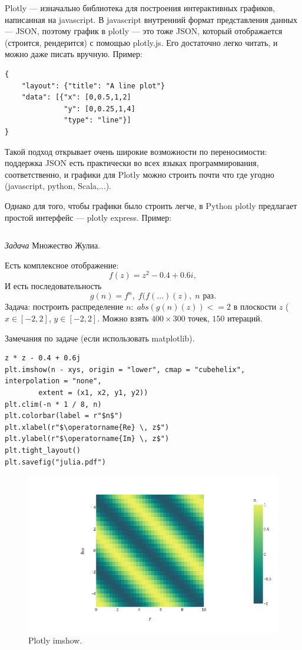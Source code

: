 \documentclass{book}
\begin{document}
Plotly --- изначально библиотека для построения интерактивных графиков, написанная на javascript. В javascript внутренний формат
представления данных --- JSON, поэтому график в plotly --- это тоже JSON, который отображается (строится, рендерится) с помощью plotly.js.
Его достаточно легко читать, и можно даже писать вручную. Пример:
\begin{verbatim}
{
    "layout": {"title": "A line plot"}
    "data": [{"x": [0,0.5,1,2]
              "y": [0,0.25,1,4]
              "type": "line"}]
}
\end{verbatim}
Такой подход открывает очень широкие возможности по переносимости: поддержка JSON есть практически во всех языках программирования,
соответственно, и графики для Plotly можно строить почти что где угодно (javascript, python, Scala,...).

Однако для того, чтобы графики было строить легче, в Python plotly предлагает простой интерфейс --- plotly express. Пример:
\inputminted{python}{simple_plotly_express.py}

\textit{Задача} Множество Жулиа.

Есть комплексное отображение:
\begin{equation}
    f(z) = z^2 - 0.4 + 0.6 i,
\end{equation}
И есть последовательность
\begin{equation}
    g(n) = f^n, \; f(f( ...)(z), \; n \text{ раз}.
\end{equation}
Задача: построить распределение $n: \; abs(g(n)(z)) <= 2$ в плоскости $z$ ($x \in
[-2, 2]$, $y \in [-2, 2]$. Можно взять $400 \times 300$ точек, $150$ итераций.

Замечания по задаче (если использовать matplotlib).
\begin{verbatim}
z * z - 0.4 + 0.6j
plt.imshow(n - xys, origin = "lower", cmap = "cubehelix", interpolation = "none",
        extent = (x1, x2, y1, y2))
plt.clim(-n * 1 / 8, n)
plt.colorbar(label = r"$n$")
plt.xlabel(r"$\operatorname{Re} \, z$")
plt.ylabel(r"$\operatorname{Im} \, z$")
plt.tight_layout()
plt.savefig("julia.pdf")
\end{verbatim}

\begin{figure}
	\includegraphics[width=0.8\linewidth]{plotly_imshow.png}
    \caption{\label{plotly-imshow}Plotly imshow.}
\end{figure}
\end{document}
